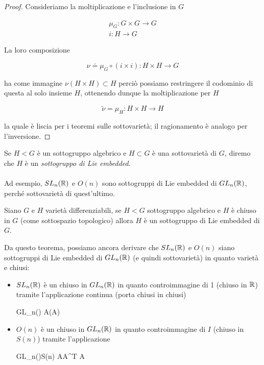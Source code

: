 \begin{proof}
	Consideriamo la moltiplicazione e l'inclusione in $ G $
	
	\begin{gather}
		\mu_{G} : G \times G \to G \\
		i : H \to G
	\end{gather}

	La loro composizione
	
	\begin{equation}
		\nu \doteq \mu_{G} \circ (i \times i) : H \times H \to G
	\end{equation}

	ha come immagine $ \nu (H \times H) \subset H $ perciò possiamo restringere il codominio di questa al solo insieme $ H $, ottenendo dunque la moltiplicazione per $ H $
	
	\begin{equation}
		\tilde{\nu} = \mu_{H} : H \times H \to H
	\end{equation}

	la quale è liscia per i teoremi sulle sottovarietà; il ragionamento è analogo per l'inversione.
\end{proof}

Se $ H < G $ è un  sottogruppo algebrico e $ H \subset G $ è una sottovarietà di $ G $, diremo che $ H $ è un \textit{sottogruppo di Lie embedded}.\\\\
%
Ad esempio, $ SL_{n}(\mathbb{R}) $ e $ O(n) $ sono sottogruppi di Lie embedded di $ GL_{n}(\mathbb{R}) $, perché sottovarietà di quest'ultimo.

\begin{theorem}\label{thm:liesub-var}
	Siano $ G $ e $ H $ varietà differenziabili, se $ H < G $ sottogruppo algebrico e $ H $ è chiuso in $ G $ (come sottospazio topologico) allora $ H $ è un sottogruppo di Lie embedded di $ G $.
\end{theorem}

Da questo teorema, possiamo ancora derivare che $ SL_{n}(\mathbb{R}) $ e $ O(n) $ siano sottogruppi di Lie embedded di $ GL_{n}(\mathbb{R}) $ (e quindi sottovarietà) in quanto varietà e chiusi:

\begin{itemize}
	\item $ SL_{n}(\mathbb{R}) $ è un chiuso in $ GL_{n}(\mathbb{R}) $ in quanto controimmagine di 1 (chiuso in $ \mathbb{R} $) tramite l'applicazione continua (porta chiusi in chiusi)
	
		{GL_{n}(\R)}{\R}
		{A}{\det(A)}
	
	\item $ O(n) $ è un chiuso in $ GL_{n}(\mathbb{R}) $ in quanto controimmagine di $ I $ (chiuso in $ S(n) $) tramite l'applicazione
	
		{GL_{n}(\R)}{S(n)}
		{A}{A^{T} A}
\end{itemize}

